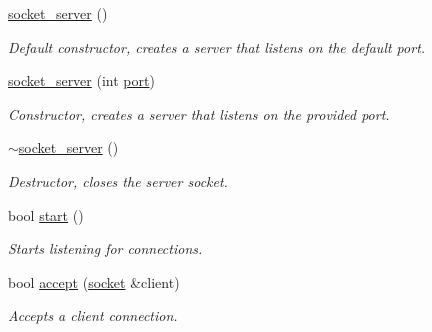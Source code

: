\begin{DoxyCompactItemize}
\item 
\mbox{\label{classcpen333_1_1process_1_1windows_1_1socket__server_a719c448f8f7f7b48dd54ac426e18fdfe}} 
\hyperlink{classcpen333_1_1process_1_1windows_1_1socket__server_a719c448f8f7f7b48dd54ac426e18fdfe}{socket\+\_\+server} ()
\begin{DoxyCompactList}\small\item\em Default constructor, creates a server that listens on the default port. \end{DoxyCompactList}\item 
\hyperlink{classcpen333_1_1process_1_1windows_1_1socket__server_ada3d9f2a11e196dc91b3199b37fe50e2}{socket\+\_\+server} (int \hyperlink{classcpen333_1_1process_1_1windows_1_1socket__server_a4b5f9231c046f947a77a6458202c2712}{port})
\begin{DoxyCompactList}\small\item\em Constructor, creates a server that listens on the provided port. \end{DoxyCompactList}\item 
\mbox{\label{classcpen333_1_1process_1_1windows_1_1socket__server_a83cf30c312cacb0bbabb2c14b32fff88}} 
\hyperlink{classcpen333_1_1process_1_1windows_1_1socket__server_a83cf30c312cacb0bbabb2c14b32fff88}{$\sim$socket\+\_\+server} ()
\begin{DoxyCompactList}\small\item\em Destructor, closes the server socket. \end{DoxyCompactList}\item 
bool \hyperlink{classcpen333_1_1process_1_1windows_1_1socket__server_a0a2021766c8d5728d044a96d24bbc684}{start} ()
\begin{DoxyCompactList}\small\item\em Starts listening for connections. \end{DoxyCompactList}\item 
bool \hyperlink{classcpen333_1_1process_1_1windows_1_1socket__server_a9faaa8159f63116a3fa5e7a68ca8095a}{accept} (\hyperlink{classcpen333_1_1process_1_1windows_1_1socket}{socket} \&client)
\begin{DoxyCompactList}\small\item\em Accepts a client connection. \end{DoxyCompactList}\item 

\end{DoxyCompactItemize}
